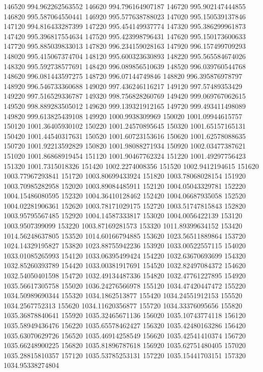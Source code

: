 {146520 994.962262563552
146620 994.796164907187
146720 995.902147444855
146820 995.587064550441
146920 995.577638788023
147020 995.150539137846
147120 994.816433287399
147220 995.454149937774
147320 995.386299961873
147420 995.396817554634
147520 995.423998796431
147620 995.150173600633
147720 995.885039833013
147820 996.234159028163
147920 996.157499709293
148020 995.415067374704
148120 995.600323630893
148220 995.565584674026
148320 995.592738577691
148420 996.089856510639
148520 996.039760544768
148620 996.081443597275
148720 996.07144749846
148820 996.395876978797
148920 996.546733360688
149020 997.436246116217
149120 997.57489353429
149220 997.516529336787
149320 998.756828260769
149420 999.069767062615
149520 998.889283505012
149620 999.139321912165
149720 999.493411498089
149820 999.613825439108
149920 1000.9938309969
150020 1001.09944615757
150120 1001.36405930102
150220 1001.24570895645
150320 1001.65157165131
150420 1001.44540317631
150520 1001.60723153616
150620 1001.62578088635
150720 1001.92213592829
150820 1001.98088271934
150920 1002.03477387621
151020 1001.86868919454
151120 1001.90467762324
151220 1001.49297756423
151320 1001.7315018326
151420 1002.2274008356
151520 1002.9412194615
151620 1003.77967293841
151720 1003.80699433924
151820 1003.78068028154
151920 1003.70985282958
152020 1003.89084485911
152120 1004.05043329781
152220 1004.15486080595
152320 1004.36410128462
152420 1004.06687935058
152520 1004.02281906361
152620 1003.78171029175
152720 1003.51747815843
152820 1003.95795567485
152920 1004.14587333817
153020 1004.0056422139
153120 1003.9507399099
153220 1003.87169281573
153320 1011.89399634152
153420 1014.56248637805
153520 1014.60166794885
153620 1023.56511889864
153720 1024.14329195827
153820 1023.88755942236
153920 1033.00522557115
154020 1033.01085265993
154120 1033.06395499424
154220 1032.63670693699
154320 1032.85260393789
154420 1033.00381917691
154520 1032.82497084372
154620 1032.54050401598
154720 1032.49134487336
154820 1032.47761227895
154920 1035.56617305758
155020 1036.24276566978
155120 1034.47420447472
155220 1034.50989690344
155320 1034.1862513877
155420 1034.24551912153
155520 1034.2567752313
155620 1034.11620356877
155720 1034.33376095656
155820 1035.36878840641
155920 1035.32465671136
156020 1035.10743774118
156120 1035.58949436476
156220 1035.65578462427
156320 1035.42480163286
156420 1035.63070629726
156520 1035.46914258549
156620 1035.42541410374
156720 1035.66248900225
156820 1035.81896787618
156920 1035.62751480405
157020 1035.28815810357
157120 1035.53785253131
157220 1035.15441703151
157320 1034.95338274804
}
